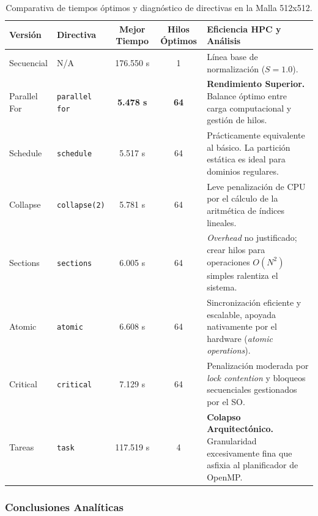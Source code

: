 \documentclass[11pt,a4paper]{article}
\begin{document}
\begin{table}[H]
\centering
\renewcommand{\arraystretch}{1.3}
\begin{tabularx}{\textwidth}{l l c c X}
\toprule
\textbf{Versión} & \textbf{Directiva} & \textbf{Mejor Tiempo} & \textbf{Hilos Óptimos} & \textbf{Eficiencia HPC y Análisis} \\
\midrule
Secuencial & N/A & 176.550 s & 1 & Línea base de normalización ($S=1.0$). \\
Parallel For & \texttt{parallel for} & \textbf{5.478 s} & \textbf{64} & \textbf{Rendimiento Superior.} Balance óptimo entre carga computacional y gestión de hilos. \\
Schedule & \texttt{schedule} & 5.517 s & 64 & Prácticamente equivalente al básico. La partición estática es ideal para dominios regulares. \\
Collapse & \texttt{collapse(2)} & 5.781 s & 64 & Leve penalización de CPU por el cálculo de la aritmética de índices lineales. \\
Sections & \texttt{sections} & 6.005 s & 64 & \textit{Overhead} no justificado; crear hilos para operaciones $O(N^2)$ simples ralentiza el sistema. \\
Atomic & \texttt{atomic} & 6.608 s & 64 & Sincronización eficiente y escalable, apoyada nativamente por el hardware (\textit{atomic operations}). \\
Critical & \texttt{critical} & 7.129 s & 64 & Penalización moderada por \textit{lock contention} y bloqueos secuenciales gestionados por el SO. \\
Tareas & \texttt{task} & 117.519 s & 4 & \textbf{Colapso Arquitectónico.} Granularidad excesivamente fina que asfixia al planificador de OpenMP. \\
\bottomrule
\end{tabularx}
\caption{Comparativa de tiempos óptimos y diagnóstico de directivas en la Malla 512x512.}
\label{tab:comparativa_final}
\end{table}

\subsubsection*{Conclusiones Analíticas}
\end{document}
